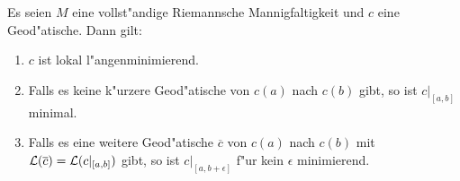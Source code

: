 \begin{Kor}\label{thm:kor-8-12}
  Es seien $M$ eine vollst"andige Riemannsche Mannigfaltigkeit und $c$ eine Geod"atische. Dann gilt:
  \begin{enumerate}[label=(\roman*),widest=iii,leftmargin=*]
  \item $c$ ist lokal l"angenminimierend.
  \item Falls es keine k"urzere Geod"atische von $c(a)$ nach $c(b)$ gibt, so ist $c|_{[a,b]}$ minimal.
  \item Falls es eine weitere Geod"atische $\overline{c}$ von $c(a)$ nach $c(b)$ mit $\operatorname{\mathcal{L}}(\overline c) = \operatorname{\mathcal{L}}(c|_{[a,b]})$ gibt, so ist $c|_{[a,b+\epsilon]}$ f"ur kein $\epsilon$ minimierend.\label{thm:kor-8-12-iii} 
  \end{enumerate}
\end{Kor}

